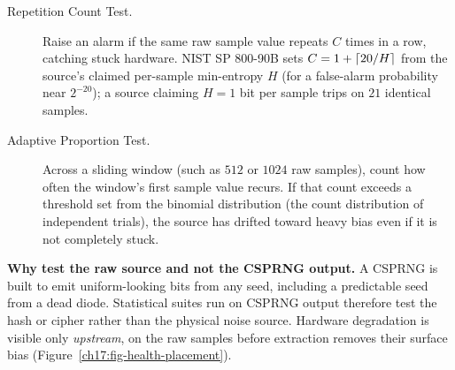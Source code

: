 \begin{description}
  \item[Repetition Count Test.] Raise an alarm if the same raw sample value repeats $C$ times in a row, catching stuck hardware. NIST SP 800-90B sets $C = 1 + \lceil20 / H\rceil$ from the source's claimed per-sample min-entropy $H$ (for a false-alarm probability near $2^{-20}$); a source claiming $H = 1$ bit per sample trips on $21$ identical samples.
  \item[Adaptive Proportion Test.] Across a sliding window (such as $512$ or $1024$ raw samples), count how often the window's first sample value recurs. If that count exceeds a threshold set from the binomial distribution (the count distribution of independent trials), the source has drifted toward heavy bias even if it is not completely stuck.
\end{description}

\begin{whybox}
\textbf{Why test the raw source and not the CSPRNG output.} A CSPRNG is built to emit uniform-looking bits from any seed, including a predictable seed from a dead diode. Statistical suites run on CSPRNG output therefore test the hash or cipher rather than the physical noise source. Hardware degradation is visible only \emph{upstream}, on the raw samples before extraction removes their surface bias (Figure~\ref{ch17:fig-health-placement}).
\end{whybox}

